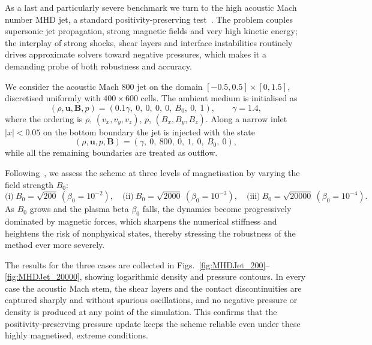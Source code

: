 \documentclass[a4paper,fleqn]{cas-sc}
\theoremstyle{definition}
\theoremstyle{remark}
\begin{document}
As a last and particularly severe benchmark we turn to the high acoustic Mach number MHD
jet, a standard positivity-preserving test~\cite{SC3,wu2018,activeflux}. The
problem couples supersonic jet propagation, strong magnetic fields and very high
kinetic energy; the interplay of strong shocks, shear layers and interface
instabilities routinely drives approximate solvers toward negative pressures,
which makes it a demanding probe of both robustness and accuracy.

We consider the acoustic Mach $800$ jet on the domain $[-0.5,0.5] \times [0,1.5]$,
discretised uniformly with $400 \times 600$ cells. The ambient medium is
initialised as
%
\begin{equation}
(\rho, \mathbf{u}, \mathbf{B}, p) = (0.1\gamma,\ 0,\ 0,\ 0,\ 0,\ B_0,\ 0,\ 1),
\qquad \gamma = 1.4,
\end{equation}
%
where the ordering is $\rho$, $(v_x,v_y,v_z)$, $p$, $(B_x,B_y,B_z)$. Along a
narrow inlet $|x| < 0.05$ on the bottom boundary the jet is injected with the
state
%
\begin{equation}
(\rho, \mathbf{u}, p, \mathbf{B}) = (\gamma,\ 0,\ 800,\ 0,\ 1,\ 0,\ B_0,\ 0),
\end{equation}
%
while all the remaining boundaries are treated as outflow.

Following~\cite{SC3,wu2018,activeflux}, we assess the scheme at three levels of
magnetisation by varying the field strength $B_0$:
%
\begin{equation}
\text{(i)}\ B_0 = \sqrt{200}\ (\beta_0 = 10^{-2}), \quad
\text{(ii)}\ B_0 = \sqrt{2000}\ (\beta_0 = 10^{-3}), \quad
\text{(iii)}\ B_0 = \sqrt{20000}\ (\beta_0 = 10^{-4}).
\end{equation}
%
As $B_0$ grows and the plasma beta $\beta_0$ falls, the dynamics become
progressively dominated by magnetic forces, which sharpens the numerical
stiffness and heightens the risk of nonphysical states, thereby stressing the
robustness of the method ever more severely.

The results for the three cases are collected in
Figs.~\ref{fig:MHDJet_200}--\ref{fig:MHDJet_20000}, showing logarithmic density and
pressure contours. In every case the acoustic Mach stem, the shear layers and the contact
discontinuities are captured sharply and without spurious oscillations, and no
negative pressure or density is produced at any point of the simulation. This
confirms that the positivity-preserving pressure update keeps the scheme reliable
even under these highly magnetised, extreme conditions.
\end{document}
